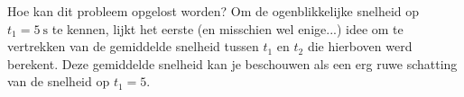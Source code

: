 \documentclass{ximera}
\begin{document}


Hoe kan dit probleem opgelost worden? 
Om de ogenblikkelijke snelheid op \(t_1 = \SI{5}{\second}\) te kennen, lijkt het eerste (en misschien wel enige...) idee om te vertrekken van de gemiddelde snelheid tussen \(t_1\) en \(t_2\) die hierboven werd berekent. 
Deze gemiddelde snelheid kan je beschouwen als een erg ruwe schatting van de snelheid op \(t_1 = 5\). 
\end{document}
